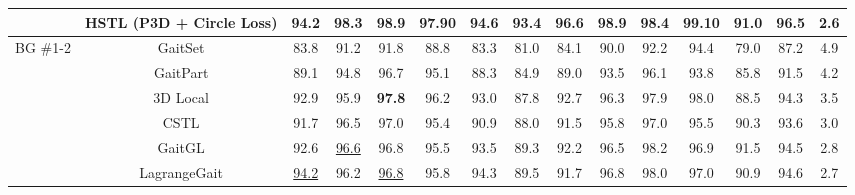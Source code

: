 \begin{table}[h]
{\begin{tabular}{c|c|ccccccccccc|c|c}
                                                       & \textbf{HSTL (P3D + Circle Loss)}             & 94.2                     & 98.3                    & 98.9             & 97.90            & 94.6             & 93.4             & 96.6             & 98.9             & 98.4             & \textbf{99.10}   & 91.0             & 96.5             & 2.6             \\
            \hline
            \multirow{4}[12]{*}{BG \#1-2}              & GaitSet \cite{chao2019gaitset}                & 83.8                     & 91.2                    & 91.8             & 88.8             & 83.3             & 81.0             & 84.1             & 90.0             & 92.2             & 94.4             & 79.0             & 87.2             & 4.9             \\
                                                       & GaitPart \cite{fan2020gaitpart}               & 89.1                     & 94.8                    & 96.7             & 95.1             & 88.3             & 84.9             & 89.0             & 93.5             & 96.1             & 93.8             & 85.8             & 91.5             & 4.2             \\
                                                       & 3D Local \cite{huang20213d}                   & 92.9                     & 95.9                    & \textbf{97.8}    & 96.2             & 93.0             & 87.8             & 92.7             & 96.3             & 97.9             & 98.0             & 88.5             & 94.3             & 3.5             \\
                                                       & CSTL \cite{huang2021context}                  & 91.7                     & 96.5                    & 97.0             & 95.4             & 90.9             & 88.0             & 91.5             & 95.8             & 97.0             & 95.5             & 90.3             & 93.6             & 3.0             \\
                                                       & GaitGL \cite{lin2021gait}                     & 92.6                     & \underline{96.6}        & 96.8             & 95.5             & 93.5             & 89.3             & 92.2             & 96.5             & 98.2             & 96.9             & 91.5             & 94.5             & 2.8             \\
                                                       & LagrangeGait \cite{chai2022lagrange}          & \underline{94.2}         & 96.2                    & \underline{96.8} & 95.8             & 94.3             & 89.5             & 91.7             & 96.8             & 98.0             & 97.0             & 90.9             & 94.6             & 2.7             \\

\end{tabular}}
\end{table}
